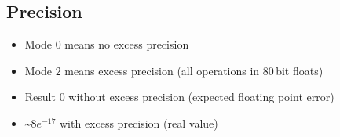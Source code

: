 \subsection{Precision}
\begin{itemize}
	\item Mode $0$ means no excess precision
	\item Mode $2$ means excess precision (all operations in $80$\,bit floats)
\end{itemize}
\begin{itemize}
	\item Result $0$ without excess precision (expected floating point error)
	\item \textasciitilde$8e^{-17}$ with excess precision (real value)
\end{itemize}

